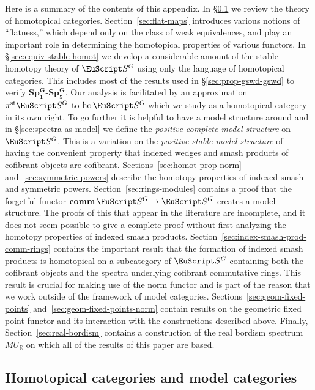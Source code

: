 \documentclass{amsart}
\theoremstyle{definition}
\theoremstyle{remark}
\newcommand{\R}{{\mathbb R}}
\newcommand{\spectra}{\EuScript S}
\newcommand{\mur}{MU_{\R}}
\DeclareMathOperator{\ho}{ho}
\newcommand{\ugspectra}[1]{\spectra^{#1}}
\DeclareMathOperator{\comm}{\mathbf{comm}}
\newcommand{\gswdes}[1]{\mathbf{Sp^{G}_{#1}}}
\newcommand{\pist}{\pi^{\text{st}}}
\begin{document}
Here is a summary of the contents of this appendix.  In
\S\ref{sec:categories-with-weak-2} we review the theory of homotopical
categories.  Section~\ref{sec:flat-maps} introduces various notions of
``flatness,'' which depend only on the class of weak equivalences, and
play an important role in determining the homotopical properties of
various functors.  In \S\ref{sec:equiv-stable-homot} we develop a
considerable amount of the stable homotopy theory of $\ugspectra{G}$
using only the language of homotopical categories.  This includes most
of the results used in \S\ref{sec:prop-gswd-gswd} to verify
$\gswdes{1}$-$\gswdes{5}$.  Our analysis is facilitated by an
approximation $\pist\ugspectra{G}$ to $\ho\ugspectra{G}$ which we
study as a homotopical category in its own right.  To go further it is
helpful to have a model structure around and in
\S\ref{sec:spectra-as-model} we define the {\em positive complete
model structure} on $\ugspectra{G}$.  This is a variation on the {\em
positive stable model structure} of~\cite{MR1922205} having the
convenient property that indexed wedges and smash products of
cofibrant objects are cofibrant.  Sections~\ref{sec:homot-prop-norm}
and~\ref{sec:symmetric-powers} describe the homotopy properties of
indexed smash and symmetric powers.  Section~\ref{sec:rings-modules}
contains a proof that the forgetful functor $\comm\ugspectra{G}\to
\ugspectra{G}$ creates a model structure.  The proofs of this that
appear in the literature are incomplete, and it does not seem possible
to give a complete proof without first analyzing the homotopy
properties of indexed smash products.
Section~\ref{sec:index-smash-prod-comm-rings} contains the important
result that the formation of indexed smash products is homotopical on
a subcategory of $\ugspectra{G}$ containing both the cofibrant objects
and the spectra underlying cofibrant commutative rings.  This result
is crucial for making use of the norm functor and is part of the
reason that we work outside of the framework of model categories.
Sections~\ref{sec:geom-fixed-points}
and~\ref{sec:geom-fixed-points-norm} contain results on the geometric
fixed point functor and its interaction with the constructions
described above.  Finally, Section~\ref{sec:real-bordism} contains a
construction of the real bordism spectrum $\mur$ on which all of the
results of this paper are based.  

\subsection{Homotopical categories and model categories}
\label{sec:categories-with-weak-2}
\end{document}

